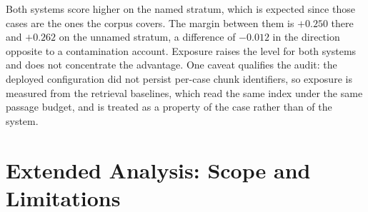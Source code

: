 \documentclass[letterpaper]{article}
\begin{document}
Both systems score higher on the named stratum, which is expected since those cases are the ones the corpus covers.
The margin between them is $+0.250$ there and $+0.262$ on the unnamed stratum, a difference of $-0.012$ in the direction opposite to a contamination account.
Exposure raises the level for both systems and does not concentrate the advantage.
One caveat qualifies the audit: the deployed configuration did not persist per-case chunk identifiers, so exposure is measured from the retrieval baselines, which read the same index under the same passage budget, and is treated as a property of the case rather than of the system.

\section{Extended Analysis: Scope and Limitations}
\label{sec:extended-scope}
\end{document}
